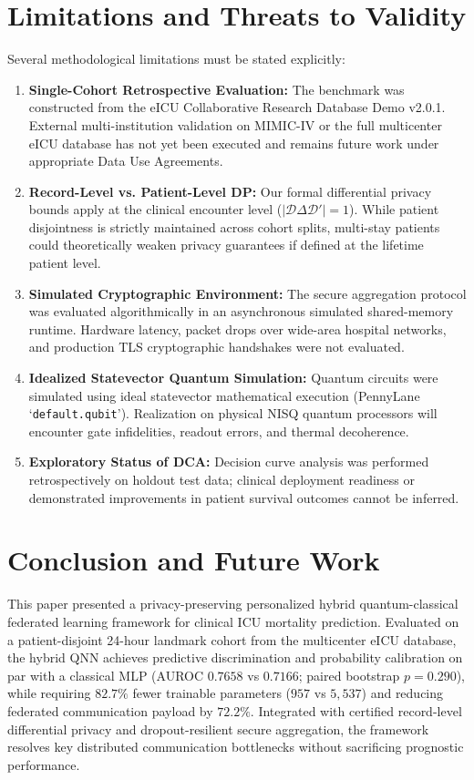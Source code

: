 \documentclass[conference]{IEEEtran}
\begin{document}
\section{Limitations and Threats to Validity}
Several methodological limitations must be stated explicitly:
\begin{enumerate}
    \item \textbf{Single-Cohort Retrospective Evaluation:} The benchmark was constructed from the eICU Collaborative Research Database Demo v2.0.1. External multi-institution validation on MIMIC-IV or the full multicenter eICU database has not yet been executed and remains future work under appropriate Data Use Agreements.
    \item \textbf{Record-Level vs. Patient-Level DP:} Our formal differential privacy bounds apply at the clinical encounter level ($|\mathcal{D} \Delta \mathcal{D}'| = 1$). While patient disjointness is strictly maintained across cohort splits, multi-stay patients could theoretically weaken privacy guarantees if defined at the lifetime patient level.
    \item \textbf{Simulated Cryptographic Environment:} The secure aggregation protocol was evaluated algorithmically in an asynchronous simulated shared-memory runtime. Hardware latency, packet drops over wide-area hospital networks, and production TLS cryptographic handshakes were not evaluated.
    \item \textbf{Idealized Statevector Quantum Simulation:} Quantum circuits were simulated using ideal statevector mathematical execution (PennyLane `\texttt{default.qubit}'). Realization on physical NISQ quantum processors will encounter gate infidelities, readout errors, and thermal decoherence.
    \item \textbf{Exploratory Status of DCA:} Decision curve analysis was performed retrospectively on holdout test data; clinical deployment readiness or demonstrated improvements in patient survival outcomes cannot be inferred.
\end{enumerate}

\section{Conclusion and Future Work}
This paper presented a privacy-preserving personalized hybrid quantum-classical federated learning framework for clinical ICU mortality prediction. Evaluated on a patient-disjoint 24-hour landmark cohort from the multicenter eICU database, the hybrid QNN achieves predictive discrimination and probability calibration on par with a classical MLP (AUROC $0.7658$ vs $0.7166$; paired bootstrap $p = 0.290$), while requiring $82.7\%$ fewer trainable parameters ($957$ vs $5,537$) and reducing federated communication payload by $72.2\%$. Integrated with certified record-level differential privacy and dropout-resilient secure aggregation, the framework resolves key distributed communication bottlenecks without sacrificing prognostic performance.
\end{document}
